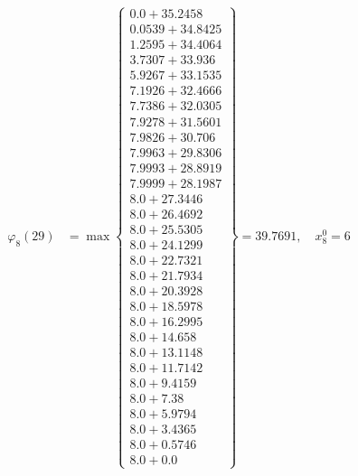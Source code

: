 \documentclass{article}
\begin{document}
\begin{align*}
\varphi_{8}(29) &= \max \left\{ \begin{array}{c}
0.0 + 35.2458 \\
 0.0539 + 34.8425 \\
 1.2595 + 34.4064 \\
 3.7307 + 33.936 \\
 5.9267 + 33.1535 \\
 7.1926 + 32.4666 \\
 7.7386 + 32.0305 \\
 7.9278 + 31.5601 \\
 7.9826 + 30.706 \\
 7.9963 + 29.8306 \\
 7.9993 + 28.8919 \\
 7.9999 + 28.1987 \\
 8.0 + 27.3446 \\
 8.0 + 26.4692 \\
 8.0 + 25.5305 \\
 8.0 + 24.1299 \\
 8.0 + 22.7321 \\
 8.0 + 21.7934 \\
 8.0 + 20.3928 \\
 8.0 + 18.5978 \\
 8.0 + 16.2995 \\
 8.0 + 14.658 \\
 8.0 + 13.1148 \\
 8.0 + 11.7142 \\
 8.0 + 9.4159 \\
 8.0 + 7.38 \\
 8.0 + 5.9794 \\
 8.0 + 3.4365 \\
 8.0 + 0.5746 \\
 8.0 + 0.0
\end{array} \right\}=39.7691, \quad x_{8}^0=6\\
  

\end{align*}
\end{document}

